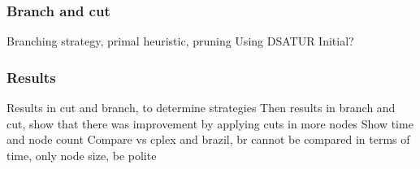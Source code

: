 \documentclass{beamer}
\begin{document}
\begin{frame}
\frametitle{Branch and cut}

Branching strategy, primal heuristic, pruning
Using DSATUR
Initial?

\end{frame} 

\begin{frame}
\frametitle{Results}

Results in cut and branch, to determine strategies
Then results in branch and cut, show that there was improvement by applying cuts in more nodes
Show time and node count
Compare vs cplex and brazil, br cannot be compared in terms of time, only node size, be polite

\end{frame} 
\end{document}
